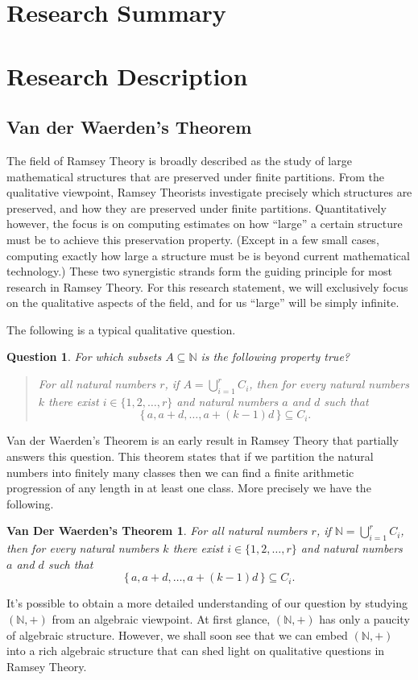 \documentclass[12pt]{article}
\theoremstyle{plain}
\newtheorem*{vdw}{Van Der Waerden's Theorem}
\newtheorem*{ques}{Question}
\theoremstyle{definition}
\newcommand{\bbN}{\mathbb{N}}
\begin{document}
\section{Research Summary}

\section{Research Description}
\subsection{Van der Waerden's Theorem}
The field of Ramsey Theory is broadly described as the study of large
mathematical structures that are preserved under finite partitions.
From the qualitative viewpoint, Ramsey Theorists investigate precisely
which structures are preserved, and how they are preserved under
finite partitions.
Quantitatively however, the focus is on computing estimates on how
``large'' a certain structure must be to achieve this preservation
property. 
(Except in a few small cases, computing exactly how large a structure
must be is beyond current mathematical technology.)
These two synergistic strands form the guiding principle for most
research in Ramsey Theory.
For this research statement, we will exclusively focus on the
qualitative aspects of the field, and for us ``large'' will
be simply infinite.

The following is a typical qualitative question.
  \begin{ques}
    For which subsets $A \subseteq \bbN$ is the following property
    true?
      \begin{quote}
        For all natural numbers $r$, if $A = \bigcup_{i=1}^r C_i$,
        then for every natural numbers $k$ there exist $i \in \{1, 2,
        \ldots, r\}$ and natural numbers $a$ and $d$ such that 
          \[
            \{\, a, a+d, \ldots, a+(k-1)d \,\} \subseteq C_i.
          \]
      \end{quote}
  \end{ques}
Van der Waerden's Theorem is an early result
\cite{Van-der-Waerden:1927fk} in Ramsey Theory that partially answers
this question.
This theorem states that if we partition the natural numbers into finitely many
classes then we can find a finite arithmetic progression of any length
in at least one class. 
More precisely we have the following. 
  \begin{vdw}
    For all natural numbers $r$, if $\bbN = \bigcup_{i=1}^r C_i$,
    then for every natural numbers $k$ there exist $i \in \{1, 2,
    \ldots, r\}$ and natural numbers $a$ and $d$ such that 
      \[
        \{\, a , a+d, \ldots, a+(k-1)d \,\} \subseteq C_i.
      \]
  \end{vdw}
It's possible to obtain a more detailed understanding of our question
by studying $(\bbN, +)$ from an algebraic viewpoint. 
At first glance, $(\bbN, +)$ has only a paucity of algebraic
structure. 
However, we shall soon see that we can embed $(\bbN, +)$ into a rich
algebraic structure that can shed light on qualitative questions in
Ramsey Theory. 
\end{document}
